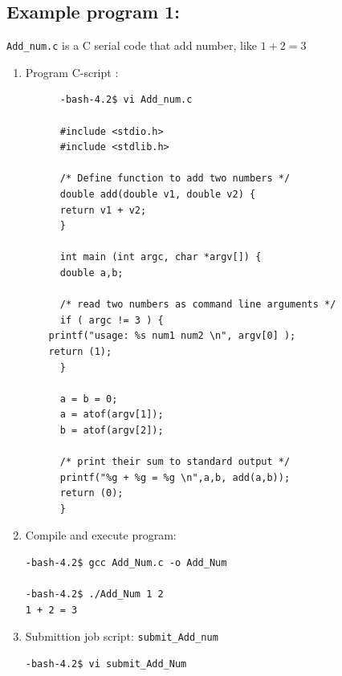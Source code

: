 \documentclass{article}
\begin{document}
\subsection{Example program 1:}  \verb+Add_num.c+ is a C serial code that add number, like $1 + 2 = 3$
\begin{enumerate}
\item Program C-script :
\scriptsize\begin{verbatim}
      -bash-4.2$ vi Add_num.c

      #include <stdio.h>
      #include <stdlib.h>

      /* Define function to add two numbers */
      double add(double v1, double v2) {
      return v1 + v2;
      }

      int main (int argc, char *argv[]) {
      double a,b;

      /* read two numbers as command line arguments */
      if ( argc != 3 ) {
	printf("usage: %s num1 num2 \n", argv[0] );
	return (1);
      }

      a = b = 0;
      a = atof(argv[1]);
      b = atof(argv[2]);

      /* print their sum to standard output */
      printf("%g + %g = %g \n",a,b, add(a,b));
      return (0);
      }
\end{verbatim}
\normalsize
\item Compile and execute program:
\scriptsize\begin{verbatim}
-bash-4.2$ gcc Add_Num.c -o Add_Num

-bash-4.2$ ./Add_Num 1 2
1 + 2 = 3 
\end{verbatim}
\normalsize
\item Submittion job script: \verb+submit_Add_num+
\scriptsize\begin{verbatim}
-bash-4.2$ vi submit_Add_Num


\end{verbatim}
\end{enumerate}
\end{document}

